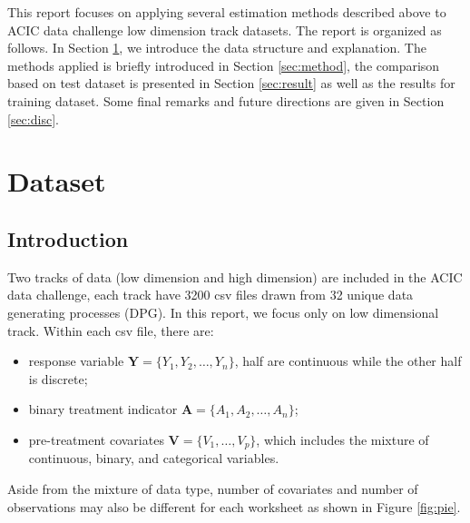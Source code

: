\documentclass[11pt, oneside]{article}
\newcommand{\bA}{\mathbf{A}}
\newcommand{\bY}{\mathbf{Y}}
\newcommand{\bV}{\mathbf{V}}
\begin{document}
This report focuses on applying several estimation methods described above to ACIC data challenge low dimension track datasets. The report is organized as follows. In Section \ref{sec:data}, we introduce the data structure and explanation. The methods applied is briefly introduced in Section \ref{sec:method}, the comparison based on test dataset is presented in Section \ref{sec:result} as well as the results for training dataset. Some final remarks and future directions are given in Section \ref{sec:disc}.
\section{Dataset}\label{sec:data}
\subsection{Introduction}
Two tracks of data (low dimension and high dimension) are included in the ACIC data challenge, each track have 3200 csv files drawn from 32 unique data generating processes (DPG). In this report, we focus only on low dimensional track. Within each csv file, there are:
\begin{itemize}
\setlength\itemsep{-0.5em}
\item response variable $\bY=\{Y_1,Y_2,\ldots,Y_n\}$, half are continuous while the other half is discrete;
\item binary treatment indicator $\bA=\{A_1,A_2,\ldots,A_n\}$;
\item pre-treatment covariates $\bV=\{V_1,\ldots,V_p\}$, which includes the mixture of continuous, binary, and categorical variables.
\end{itemize}
Aside from the mixture of data type, number of covariates and number of observations may also be different for each worksheet as shown in Figure \ref{fig:pie}.
\end{document}
